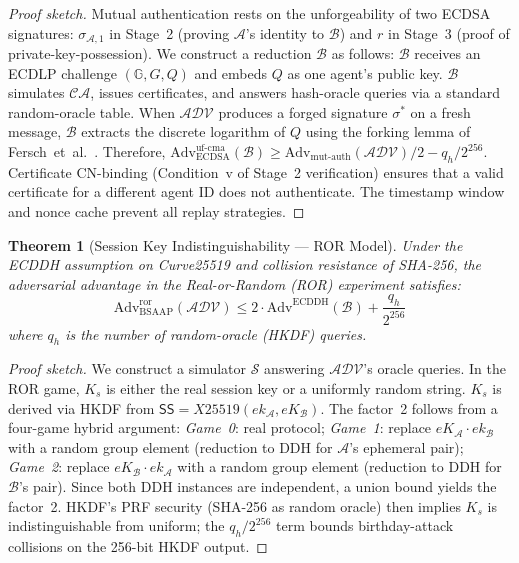 \documentclass[review,5p,twocolumn,times]{elsarticle}
\newtheorem{theorem}{Theorem}[section]
\begin{document}
\begin{proof}[Proof sketch]
Mutual authentication rests on the unforgeability of two ECDSA signatures:
$\sigma_{\mathcal{A},1}$ in Stage~2 (proving $\mathcal{A}$'s identity to
$\mathcal{B}$) and $r$ in Stage~3 (proof of private-key-possession).
We construct a reduction $\mathcal{B}$ as follows: $\mathcal{B}$ receives
an ECDLP challenge $(\mathbb{G}, G, Q)$ and embeds $Q$ as one agent's
public key. $\mathcal{B}$ simulates $\mathcal{CA}$, issues certificates,
and answers hash-oracle queries via a standard random-oracle table. When
$\mathcal{ADV}$ produces a forged signature $\sigma^*$ on a fresh message,
$\mathcal{B}$ extracts the discrete logarithm of $Q$ using the forking
lemma of Fersch~et~al.\ \cite{fersch2016provable}. Therefore,
$\mathrm{Adv}^{\mathrm{uf\text{-}cma}}_{\mathrm{ECDSA}}(\mathcal{B})
\geq \mathrm{Adv}_{\mathrm{mut\text{-}auth}}(\mathcal{ADV})/2
- q_h/2^{256}$.
Certificate CN-binding (Condition~v of Stage~2 verification) ensures that
a valid certificate for a different agent ID does not authenticate.
The timestamp window and nonce cache prevent all replay strategies.
\end{proof}

\begin{theorem}[Session Key Indistinguishability --- ROR Model]\label{thm:ror}
Under the ECDDH assumption on Curve25519 and collision resistance of SHA-256,
the adversarial advantage in the Real-or-Random (ROR) experiment
\cite{bellare2000authenticated} satisfies:
\begin{equation}
\mathrm{Adv}^{\mathrm{ror}}_{\mathrm{BSAAP}}(\mathcal{ADV}) \leq
2 \cdot \mathrm{Adv}^{\mathrm{ECDDH}}(\mathcal{B}) +
\frac{q_h}{2^{256}}
\label{eq:ror}
\end{equation}
where $q_h$ is the number of random-oracle (HKDF) queries.
\end{theorem}

\begin{proof}[Proof sketch]
We construct a simulator $\mathcal{S}$ answering $\mathcal{ADV}$'s oracle
queries. In the ROR game, $K_s$ is either the real session key or a uniformly
random string. $K_s$ is derived via HKDF from
$\mathsf{SS} = X25519(ek_\mathcal{A}, eK_\mathcal{B})$.
The factor~2 follows from a four-game hybrid argument:
\emph{Game~0}: real protocol;
\emph{Game~1}: replace $eK_\mathcal{A} \cdot ek_\mathcal{B}$ with a random
group element (reduction to DDH for $\mathcal{A}$'s ephemeral pair);
\emph{Game~2}: replace $eK_\mathcal{B} \cdot ek_\mathcal{A}$ with a random
group element (reduction to DDH for $\mathcal{B}$'s pair).
Since both DDH instances are independent, a union bound yields
the factor~2. HKDF's PRF security (SHA-256 as random oracle) then implies
$K_s$ is indistinguishable from uniform;
the $q_h/2^{256}$ term bounds birthday-attack collisions on the
256-bit HKDF output.
\end{proof}
\end{document}

